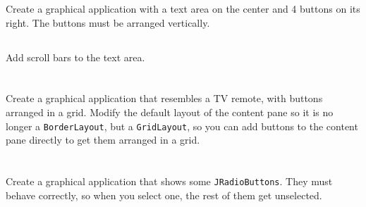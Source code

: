 \documentclass[a4paper, 11pt]{article}
\begin{document}
Create a graphical application with a text area on the center and 4 buttons
on its right. The buttons must be arranged vertically.

\subsection{}

Add scroll bars to the text area.

\section{}

\subsection{}

Create a graphical application that resembles a TV remote, with buttons
arranged in a grid. Modify the default layout of the content pane so it is no
longer a \verb+BorderLayout+, but a \verb+GridLayout+, so you can add buttons
to the content pane directly to get them arranged in a grid.


\section{}

\subsection{}

Create a graphical application that shows some \verb+JRadioButtons+. They must
behave correctly, so when you select one, the rest of them get unselected.
\end{document}
